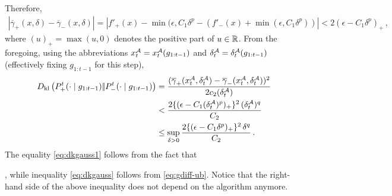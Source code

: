 Therefore,
\begin{align}
 |\overline{\gamma}_+(x,\delta) - \overline{\gamma}_-(x,\delta)| 
 = | f'_+(x) - \min(\epsilon,C_1 \delta^p - (f'_-(x)+\min(\epsilon,C_1 \delta^p)) | 
 < 2 (\epsilon - C_1 \delta^p)_+\,,
 \label{eq:gdiff-ub}
\end{align}
where $(u)_+ = \max(u,0)$ denotes the positive part of $u\in \mathbb{R}$.
From the foregoing, using the abbreviations $x_t^{\mathcal{A}} = x^{\mathcal{A}}_t(g_{1:t-1})$ and $\delta_t^{\mathcal{A}} = \delta^{\mathcal{A}}_t(g_{1:t-1})$ (effectively fixing $g_{1:t-1}$ for this step),
\begin{align}
D_{\rm kl}\left({P_{+}^t(\cdot\mid g_{1:t-1})} |\!| {P_{-}^t(\cdot\mid g_{1:t-1})} \right)
& =\dfrac{(\overline{\gamma}_{+}(x_t^{\mathcal{A}},\delta_t^{\mathcal{A}}) - \overline{\gamma}_{-}(x_t^{\mathcal{A}},\delta_t^{\mathcal{A}}))^2}{2 c_2(\delta^{\mathcal{A}}_t)}
				\label{eq:dkgauss1}\\
& < \dfrac{2\{(\epsilon-C_1(\delta^{\mathcal{A}}_t)^p)_+\}^2\,(\delta^{\mathcal{A}}_t)^q}{C_2}\label{eq:dkgauss}\\
& \le  \sup_{\delta>0} \dfrac{2\{(\epsilon-C_1\delta^p)_+\}^2\,\delta^q}{C_2} \label{eq:supdelta}\,.
\end{align}
The equality \eqref{eq:dkgauss1} follows from the fact that 

, while inequality \eqref{eq:dkgauss} follows from \eqref{eq:gdiff-ub}. Notice that the right-hand side of the above inequality does not depend on the algorithm anymore.

